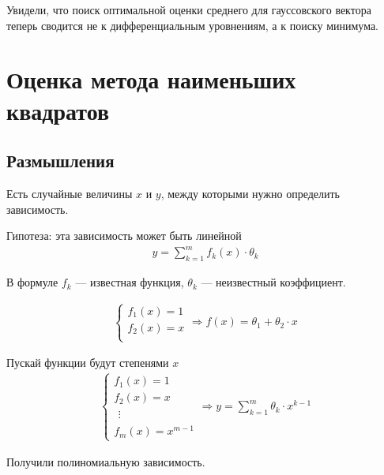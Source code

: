 Увидели, что поиск оптимальной оценки среднего для гауссовского вектора
теперь сводится не к дифференциальным уровнениям, а к поиску минимума.

\section{Оценка метода наименьших квадратов}

\subsection{Размышления}

Есть случайные величины $x$ и $y$, между которыми нужно определить зависимость.

Гипотеза: эта зависимость может быть линейной
\begin{align*}
    y = \sum_{k=1}^{m}f_k\left( x \right) \cdot \theta_k
\end{align*}

В формуле $f_k$ --- известная функция, $\theta_k$ --- неизвестный коэффициент.

\begin{example}
    \begin{align*}
        \begin{cases}
            f_1\left( x \right) = 1 \\
            f_2\left( x \right) = x \\
        \end{cases} \Rightarrow
        f\left( x \right) = \theta_1 + \theta_2 \cdot x
    \end{align*}
\end{example}

\begin{example}
    Пускай функции будут степенями $x$
    \begin{align*}
        \begin{cases}
            f_1\left( x \right) = 1 \\
            f_2\left( x \right) = x \\
            \begin{array}{c}
            \vdots
            \end{array} \\
            f_m\left( x \right) = x^{m-1}
        \end{cases} \Rightarrow
        y = \sum_{k=1}^{m} \theta_k \cdot x^{k-1}
    \end{align*}

    Получили полиномиальную зависимость.
\end{example}

